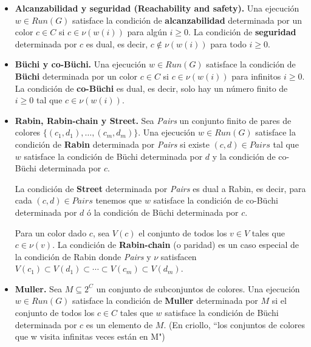 \begin{itemize}
	\item \textbf{Alcanzabilidad y seguridad (Reachability and safety).} Una ejecución \(w \in \textit{Run}(G)\) satisface la condición de \textbf{alcanzabilidad} determinada por un color \(c \in C\) si \(c \in \nu(w(i))\) para algún \(i \geq 0\). La condición de \textbf{seguridad} determinada por \(c\) es dual, es decir, \(c \notin \nu(w(i))\) para todo \(i \geq 0\).

	\item \textbf{Büchi y co-Büchi.} Una ejecución \(w \in \textit{Run}(G)\) satisface la condición de \textbf{Büchi} determinada por un color \(c \in C\) si \(c \in \nu(w(i))\) para infinitos \(i \geq 0\). La condición de \textbf{co-Büchi} es dual, es decir, solo hay un número finito de \(i \geq 0\) tal que \(c \in \nu(w(i))\).

	\item \textbf{Rabin, Rabin-chain y Street.} Sea \textit{Pairs} un conjunto finito de pares de colores \newline \(\{(c_1, d_1), \ldots, (c_m, d_m)\}\). Una ejecución \(w \in \textit{Run}(G)\) satisface la condición de \textbf{Rabin} determinada por \textit{Pairs} si existe \((c, d) \in \textit{Pairs}\) tal que \(w\) satisface la condición de Büchi determinada por \(d\) y la condición de co-Büchi determinada por \(c\).

	      La condición de \textbf{Street} determinada por \textit{Pairs} es dual a Rabin,
	      es decir, para cada \((c, d) \in \textit{Pairs}\) tenemos que \(w\) satisface
	      la condición de co-Büchi determinada por \(d\) ó la condición de Büchi
	      determinada por \(c\).

	      Para un color dado \(c\), sea \(V(c)\) el conjunto de todos los \(v \in V\)
	      tales que \(c \in \nu(v)\). La condición de \textbf{Rabin-chain} (o paridad) es
	      un caso especial de la condición de Rabin donde \textit{Pairs} y \(\nu\)
	      satisfacen \(V(c_1) \subset V(d_1) \subset \cdots \subset V(c_m) \subset
	      V(d_m)\).

	\item \textbf{Muller.} Sea \(M \subseteq 2^C\) un conjunto de subconjuntos de colores. Una ejecución \(w \in \textit{Run}(G)\) satisface la condición de \textbf{Muller} determinada por \(M\) si el conjunto de todos los \(c \in C\) tales que \(w\) satisface la condición de Büchi determinada por \(c\) es un elemento de \(M\). (En criollo, ``los conjuntos de colores que w visita infinitas veces están en M")
\end{itemize}


